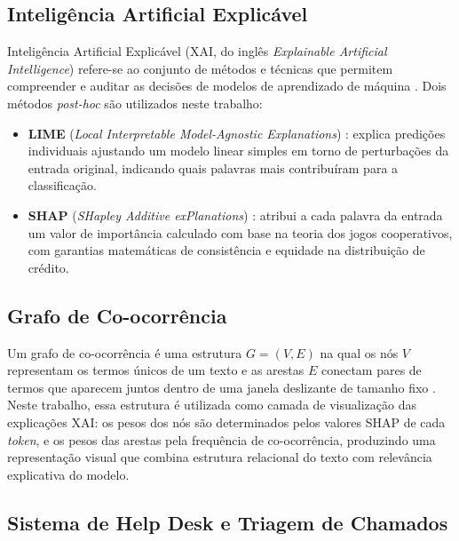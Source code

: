 \documentclass[
    12pt,                %
    openright,           %
    oneside,             %
    a4paper,             %
    english,             %
    brazil               %
]{abntex2}
\begin{document}
\subsection{Inteligência Artificial Explicável}
 
Inteligência Artificial Explicável (XAI, do inglês \textit{Explainable Artificial Intelligence}) refere-se ao conjunto de métodos e técnicas que permitem compreender e auditar as decisões de modelos de aprendizado de máquina \cite{salih2023}. Dois métodos \textit{post-hoc} são utilizados neste trabalho:
 
\begin{itemize}
    \item \textbf{LIME} (\textit{Local Interpretable Model-Agnostic Explanations}) \cite{ribeiro2016}: explica predições individuais ajustando um modelo linear simples em torno de perturbações da entrada original, indicando quais palavras mais contribuíram para a classificação.
 
    \item \textbf{SHAP} (\textit{SHapley Additive exPlanations}) \cite{lundberg2017}: atribui a cada palavra da entrada um valor de importância calculado com base na teoria dos jogos cooperativos, com garantias matemáticas de consistência e equidade na distribuição de crédito.
\end{itemize}
 
\subsection{Grafo de Co-ocorrência}
 
Um grafo de co-ocorrência é uma estrutura $G = (V, E)$ na qual os nós $V$ representam os termos únicos de um texto e as arestas $E$ conectam pares de termos que aparecem juntos dentro de uma janela deslizante de tamanho fixo \cite{yao2019}. Neste trabalho, essa estrutura é utilizada como camada de visualização das explicações XAI: os pesos dos nós são determinados pelos valores SHAP de cada \textit{token}, e os pesos das arestas pela frequência de co-ocorrência, produzindo uma representação visual que combina estrutura relacional do texto com relevância explicativa do modelo.
 
\subsection{Sistema de Help Desk e Triagem de Chamados}
 
\end{document}
